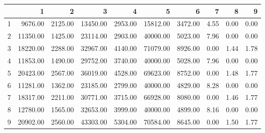 \begin{table}[ht]
\centering
\begin{tabular}{rrrrrrrrrr}
  \hline
 & 1 & 2 & 3 & 4 & 5 & 6 & 7 & 8 & 9 \\ 
  \hline
1 & 9676.00 & 2125.00 & 13450.00 & 2953.00 & 15812.00 & 3472.00 & 4.55 & 0.00 & 0.00 \\ 
  2 & 11350.00 & 1425.00 & 23114.00 & 2903.00 & 40000.00 & 5023.00 & 7.96 & 0.00 & 0.00 \\ 
  3 & 18220.00 & 2288.00 & 32967.00 & 4140.00 & 71079.00 & 8926.00 & 0.00 & 1.44 & 1.78 \\ 
  4 & 11853.00 & 1490.00 & 29752.00 & 3740.00 & 40000.00 & 5028.00 & 7.96 & 0.00 & 0.00 \\ 
  5 & 20423.00 & 2567.00 & 36019.00 & 4528.00 & 69623.00 & 8752.00 & 0.00 & 1.48 & 1.77 \\ 
  6 & 11281.00 & 1362.00 & 23185.00 & 2799.00 & 40000.00 & 4829.00 & 8.28 & 0.00 & 0.00 \\ 
  7 & 18317.00 & 2211.00 & 30771.00 & 3715.00 & 66928.00 & 8080.00 & 0.00 & 1.46 & 1.77 \\ 
  8 & 12780.00 & 1565.00 & 32653.00 & 3999.00 & 40000.00 & 4899.00 & 8.16 & 0.00 & 0.00 \\ 
  9 & 20902.00 & 2560.00 & 43303.00 & 5304.00 & 70584.00 & 8645.00 & 0.00 & 1.50 & 1.77 \\ 
   \hline
\end{tabular}
\end{table}
